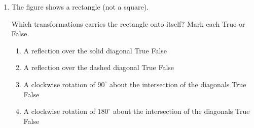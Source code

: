 \begin{enumerate}
\newpage
\item The figure shows a rectangle (not a square).
\begin{center}
\end{center}
Which transformations carries the rectangle onto itself? Mark each True or False.
  \begin{enumerate}
    \item A reflection over the solid diagonal \hfill True \quad False
    \item A reflection over the dashed diagonal \hfill True \quad False
    \item A clockwise rotation of $90^\circ$ about the intersection of the diagonals \hfill True \quad False
    \item A clockwise rotation of $180^\circ$ about the intersection of the diagonals \hfill True \quad False
  \end{enumerate}


\end{enumerate}
